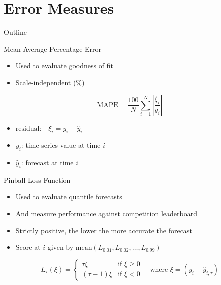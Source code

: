 \documentclass{beamer}
\begin{document}
\section{Error Measures}
\begin{frame}[noframenumbering]{Outline}
\tableofcontents[currentsection]
\end{frame}

\begin{frame}{Mean Average Percentage Error}
\begin{itemize}
\item Used to evaluate goodness of fit
\pause
\item Scale-independent (\%)
\end{itemize}
\pause
\[
\text{MAPE}=\frac{100}{N}\sum^N_{i=1} \left|\frac{\xi_i}{y_i}\right|
\]
\pause
\begin{itemize}
\item $\text{residual:}\quad \xi_i=y_i - \hat{y}_i$
\pause
\item $y_i$: time series value at time $i$
\item $\hat{y}_i$: forecast at time $i$
\end{itemize}
\end{frame}

\begin{frame}{Pinball Loss Function}
\begin{itemize}
\item Used to evaluate quantile forecasts
\item And measure performance against competition leaderboard
\pause
\item Strictly positive, the lower the more accurate the forecast
\pause
\item Score at $i$ given by $\text{mean}(L_{0.01}, L_{0.02}, \dots, L_{0.99})$
\end{itemize}
\pause
\[
  L_{\tau}(\xi)=\begin{cases} \tau \xi & \text{if } \xi \geq 0 \\
                                          (\tau-1)\xi & \text{if } \xi < 0 
                                  \end{cases} \quad\text{where } \xi=(y_i-\hat{y}_{i,\tau})
\]

\begin{figure}
\centering
{}
\end{figure}
\end{frame}
\end{document}

